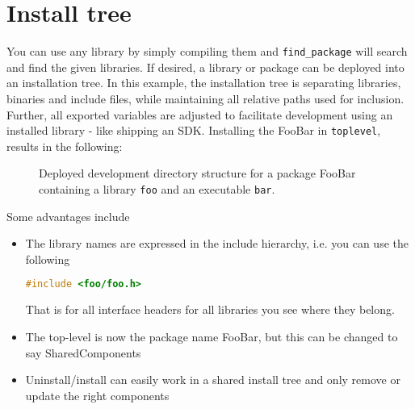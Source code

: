 \documentclass[12pt,a4wide]{article}
\begin{document}
\section{Install tree}
You can use any library by simply compiling them and
\lstinline{find_package} will search and find the given libraries. If
desired, a library or package can be deployed into an installation
tree. In this example, the installation tree is separating libraries,
binaries and include files, while maintaining all relative paths used
for inclusion. Further, all exported variables are adjusted to
facilitate development using an installed library - like shipping an
SDK. Installing the FooBar in \lstinline{toplevel}, results in the following:
\begin{figure}[htbp]
\begin{center}
\begin{minipage}[c]{.9\columnwidth }
  \centering
{}
\end{minipage}
\end{center}
\caption{Deployed development directory structure for a package {\ttfamily FooBar}
  containing a library \lstinline{foo} and an executable \lstinline{bar}.}
\label{fig:foo_directory}
\end{figure}

Some advantages include
\begin{itemize}
\item The library names are expressed in the include
hierarchy, i.e. you can use the following  
\begin{lstlisting}[language=c]
#include <foo/foo.h>
\end{lstlisting}
That is for all interface headers for all libraries you see where they
belong.
\item The top-level is now the package name {\ttfamily FooBar}, but
  this can be changed to say {\ttfamily SharedComponents}
\item Uninstall/install can easily work in a shared install tree and only
  remove or update the right components
\end{itemize}
\end{document}

